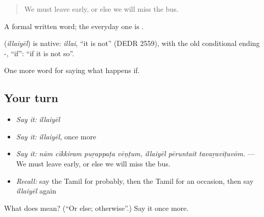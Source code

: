 \begin{quote}
We must leave early, or else we will miss the bus.
\end{quote}

A formal written word; the everyday one is .

\begin{cousinweb}
\textbf{} (\emph{illaiyēl}) is native: \emph{illai}, \textquotedblleft{}it is not\textquotedblright{} (DEDR 2559), with the old conditional ending -, \textquotedblleft{}if\textquotedblright{}: \textquotedblleft{}if it is not so\textquotedblright{}.
\end{cousinweb}

\begin{grammarlens}[title={What you've built}]
One more word for saying what happens if.
\end{grammarlens}

\subsection*{Your turn}
\begin{itemize}
\raggedright
  \item \emph{Say it:} \emph{illaiyēl}
  \item \emph{Say it:} \emph{illaiyēl}, once more
  \item \emph{Say it:} \emph{nām cīkkiram puṟappaṭa vēṇṭum, illaiyēl pēruntait tavaṟaviṭuvōm.} — We must leave early, or else we will miss the bus.
  \item \emph{Recall:} say the Tamil for probably, then the Tamil for an occasion, then say \emph{illaiyēl} again
\end{itemize}

\begin{tcolorbox}[breakable,colback=teal!4,colframe=teal!35!black,title={Before you move on}]
What does  mean? (\textquotedblleft{}Or else; otherwise\textquotedblright{}.) Say it once more.
\end{tcolorbox}
